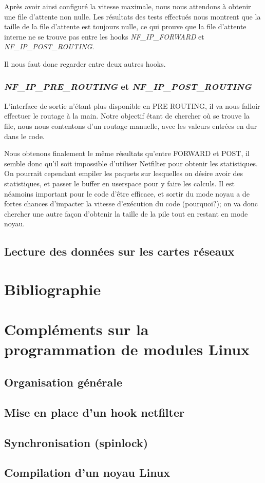 \documentclass[a4paper]{article}
\begin{document}
Après avoir ainsi configuré la vitesse maximale,
nous nous attendons à obtenir une file d’attente non nulle.
Les résultats des tests effectués nous montrent que la taille
de la file d’attente est toujours nulle, ce qui prouve que la
file d’attente interne ne se trouve pas entre les hooks
\textit{NF\_IP\_FORWARD} et \textit{NF\_IP\_POST\_ROUTING}.

Il nous faut donc regarder entre deux autres hooks.

\subsubsection{\textit{NF\_IP\_PRE\_ROUTING} et \textit{NF\_IP\_POST\_ROUTING}}
L'interface de sortie n'étant plus disponible en PRE ROUTING,
il va nous falloir effectuer le routage à la main. Notre
objectif étant de chercher où se trouve la file, nous nous
contentons d'un routage manuelle, avec les valeurs entrées en
dur dans le code.

Nous obtenons finalement le même résultats qu'entre FORWARD et POST,
il semble donc qu'il soit impossible d'utiliser Netfilter pour
obtenir les statistiques. On pourrait cependant empiler les paquets
sur lesquelles on désire avoir des statistiques, et passer le
buffer en userspace pour y faire les calculs. Il est néamoins
important pour le code d'être efficace, et sortir du mode noyau
a de fortes chances d'impacter la vitesse d'exécution du code
(pourquoi?); on va donc chercher une autre façon d'obtenir
la taille de la pile tout en restant en mode noyau.

\subsection{Lecture des données sur les cartes réseaux}

\section{Bibliographie}

\newpage
\appendix

\section{Compléments sur la programmation de modules Linux}
\subsection{Organisation générale}
\subsection{Mise en place d'un hook netfilter}
\subsection{Synchronisation (spinlock)}
\subsection{Compilation d'un noyau Linux}
\end{document}

